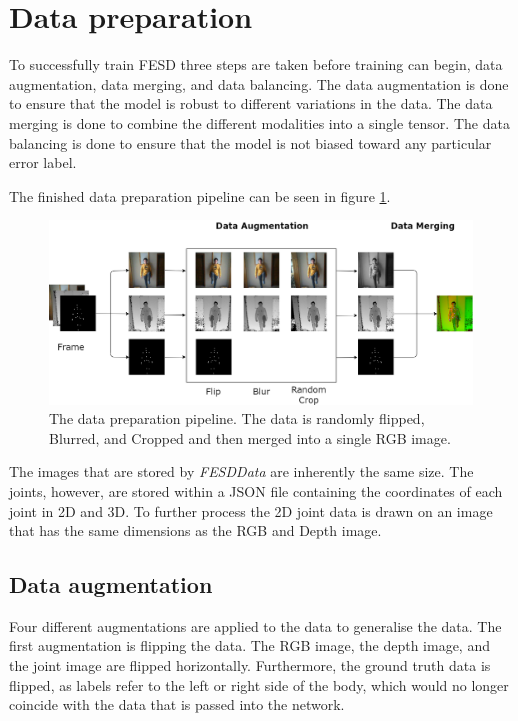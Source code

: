 \section{Data preparation}
\label{sec:data_preparation}

To successfully train FESD three steps are taken before training can begin, data augmentation, data merging, and data balancing. The data augmentation is done to ensure that the model is robust to different variations in the data. The data merging is done to combine the different modalities into a single tensor. The data balancing is done to ensure that the model is not biased toward any particular error label.

The finished data preparation pipeline can be seen in figure \ref{fig:data_preparation_pipeline}.

\begin{figure}
  \centering
  \includegraphics[width=\linewidth]{figures/ProcessingPipeline/DataProcessing.png}
  \caption[Data preparation pipeline]{The data preparation pipeline. The data is randomly flipped, Blurred, and Cropped and then merged into a single RGB image.}
  \label{fig:data_preparation_pipeline}
\end{figure}

The images that are stored by \textit{FESDData} are inherently the same size. The joints, however, are stored within a JSON file containing the coordinates of each joint in 2D and 3D. To further process the 2D joint data is drawn on an image that
 has the same dimensions as the RGB and Depth image.

\subsection{Data augmentation}

Four different augmentations are applied to the data to generalise the data. The first augmentation is flipping the data. The RGB image, the depth image, and the joint image are flipped horizontally. Furthermore, the ground truth data is flipped, as labels refer to the left or right side of the body, which would no longer coincide with the data that is passed into the network.


